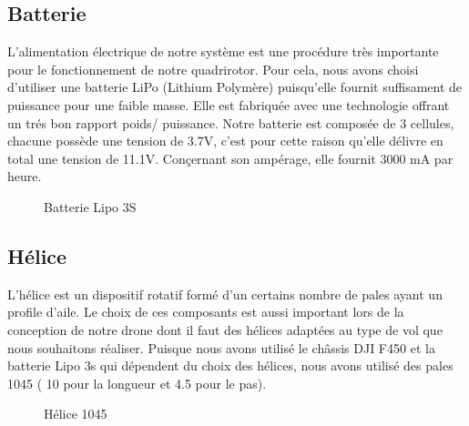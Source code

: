 \documentclass[a4paper,12pt]{book}
\begin{document}
	\subsection{Batterie}
L'alimentation électrique de notre système est une procédure très importante pour le fonctionnement de notre quadrirotor. Pour cela, nous avons choisi d'utiliser une batterie LiPo (Lithium Polymère) puisqu'elle fournit suffisament de puissance pour une faible masse. Elle est fabriquée avec une technologie offrant un trés bon rapport poids/ puissance. Notre batterie est composée de 3 cellules, chacune possède une tension de 3.7V, c'est pour cette raison qu'elle délivre en total une tension de 11.1V. Conçernant son ampérage, elle fournit 3000 mA par heure.
	\par
	\begin{figure} [h]
		\begin{center}
			\centering
	\end{center}
		\caption{Batterie Lipo 3S}
	\end{figure}
\subsection{Hélice}
 L’hélice est un dispositif rotatif formé d’un certains nombre de pales ayant un profile d’aile. Le choix de ces composants est aussi important lors de la conception de notre drone dont il faut des hélices adaptées au type de vol que nous souhaitons réaliser. Puisque nous avons utilisé le châssis DJI F450 et la batterie Lipo 3s qui dépendent du choix des hélices, nous avons utilisé des pales 1045 ( 10 pour la longueur et 4.5 pour le pas).
	\begin{figure} [h]
	\begin{center}
		\centering
{}
	\end{center}
	\caption{Hélice 1045}
\end{figure}
\end{document}
